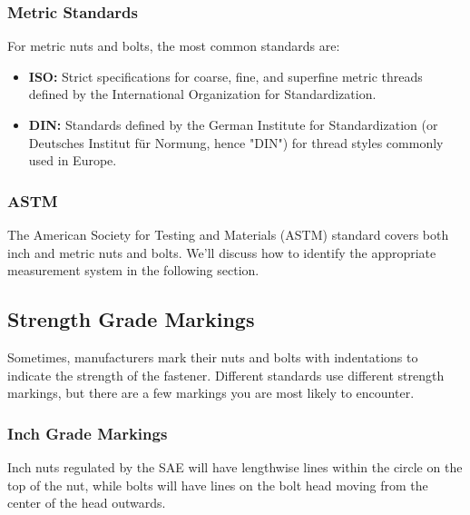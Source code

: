 \documentclass[12pt, a4paper]{article}
\providecommand{\tightlist}{%
	\setlength{\itemsep}{0pt}\setlength{\parskip}{0pt}}
\providecommand{\tightlist}{%
	\setlength{\itemsep}{0pt}\setlength{\parskip}{0pt}}
\begin{document}
		\hypertarget{i9a69k}{%
			\subsubsection{Metric Standards}\label{i9a69k}}
		
		\hypertarget{iqka0h}{}
		For metric nuts and bolts, the most common standards are:
		
		\begin{itemize}
			\tightlist
			\item
			\textbf{ISO:} Strict specifications for coarse, fine, and superfine
			metric threads defined by the International Organization for
			Standardization.
			\item
			\textbf{DIN:} Standards defined by the German Institute for
			Standardization (or Deutsches Institut für Normung, hence "DIN") for
			thread styles commonly used in Europe.
		\end{itemize}
		
		\hypertarget{iqn22v}{%
			\subsubsection{ASTM}\label{iqn22v}}
		
		\hypertarget{i8rga1s}{}
		The American Society for Testing and Materials (ASTM) standard covers
		both inch and metric nuts and bolts. We'll discuss how to identify the
		appropriate measurement system in the following section.
		
		\hypertarget{iaa4t5o}{%
			\subsection{Strength Grade Markings}\label{iaa4t5o}}
		
		\hypertarget{i0htiud}{}
		Sometimes, manufacturers mark their nuts and bolts with indentations to
		indicate the strength of the fastener. Different standards use different
		strength markings, but there are a few markings you are most likely to
		encounter.
		
		\hypertarget{iw5uma}{%
			\subsubsection{Inch Grade Markings}\label{iw5uma}}
		
		\hypertarget{i7qq3fl}{}
		Inch nuts regulated by the SAE will have lengthwise lines within the
		circle on the top of the nut, while bolts will have lines on the bolt
		head moving from the center of the head outwards.
		
\end{document}
